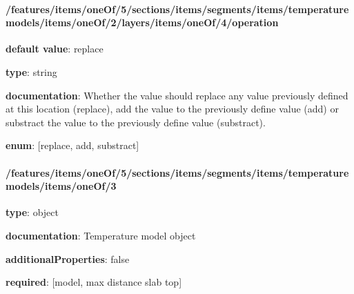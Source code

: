 \begin{itemized}
\end{itemized}\paragraph{/features/items/oneOf/5/sections/items/segments/items/temperature models/items/oneOf/2/layers/items/oneOf/4/operation} \begin{itemized}
\item {\bf default value}: replace
\item {\bf type}: string
\item {\bf documentation}: Whether the value should replace any value previously defined at this location (replace), add the value to the previously define value (add) or substract the value to the previously define value (substract).
\item {\bf enum}: [replace, add, substract]\end{itemized}\paragraph{/features/items/oneOf/5/sections/items/segments/items/temperature models/items/oneOf/3} \begin{itemized}
\item {\bf type}: object
\item {\bf documentation}: Temperature model object
\item {\bf additionalProperties}: false
\item {\bf required}: [model, max distance slab top]\end{itemized}

